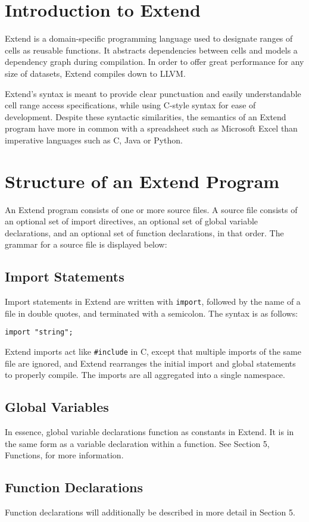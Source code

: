 \section{Introduction to Extend}
	Extend is a domain-specific programming language used to designate ranges of cells as reusable functions. It abstracts dependencies between cells and models a dependency graph during compilation. In order to offer great performance for any size of datasets, Extend compiles down to LLVM.
	
	Extend's syntax is meant to provide clear punctuation and easily understandable cell range access specifications, while using C-style syntax for ease of development. Despite these syntactic similarities, the semantics of an Extend program have more in common with a spreadsheet such as Microsoft Excel than imperative languages such as C, Java or Python.
\section{Structure of an Extend Program}
	An Extend program consists of one or more source files. A source file consists of an optional set of import directives, an optional set of global variable declarations, and an optional set of function declarations, in that order. The grammar for a source file is displayed below:

	\subsection{Import Statements}
		Import statements in Extend are written with \texttt{import}, followed by the name of a file in double quotes, and terminated with a semicolon. The syntax is as follows:
		\begin{lstlisting}
import "string";
		\end{lstlisting}
		
		Extend imports act like \texttt{\#include} in C, except that multiple imports of the same file are ignored, and Extend rearranges the initial import and global statements to properly compile. The imports are all aggregated into a single namespace.
	\subsection{Global Variables}
		In essence, global variable declarations function as constants in Extend. It is in the same form as a variable declaration within a function. See Section 5, Functions, for more information.
	\subsection{Function Declarations}
		Function declarations will additionally be described in more detail in Section 5.
